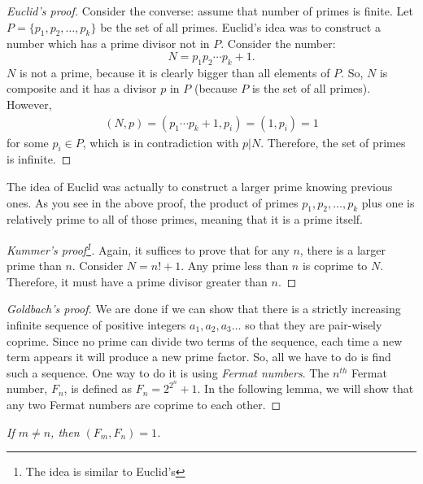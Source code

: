 \documentclass{subfiles}
\begin{document}
		\begin{proof}[Euclid's proof]
			Consider the converse: assume that number of primes is finite. Let $P=\{p_1,p_2,\ldots,p_k\}$ be the set of all primes. Euclid's idea was to construct a number which has a prime divisor not in $P$. Consider the number:
			\[N=p_1p_2\cdots p_k+1.\]
			$N$ is not a prime, because it is clearly bigger than all elements of $P$. So, $N$ is composite and it has a divisor $p$ in $P$ (because $P$ is the set of all primes). However,
				\begin{align}\label{eq:euclidprime}
					(N,p)=(p_1\cdots p_k+1,p_i)=(1,p_i)=1
				\end{align} 
			for some $p_i \in P$, which is in contradiction with $p|N$. Therefore, the set of primes is infinite.
		\end{proof}
		
		\begin{note}
			The idea of Euclid was actually to construct a larger prime knowing previous ones. As you see in the above proof, the product of primes $p_1, p_2, \ldots, p_k$ plus one is relatively prime to all of those primes, meaning that it is a prime itself.
		\end{note}
		
		\begin{proof}[Kummer's proof\footnote{The idea is similar to Euclid's}]
			Again, it suffices to prove that for any $n$, there is a larger prime than $n$. Consider $N=n!+1$. Any prime less than $n$ is coprime to $N$. Therefore, it must have a prime divisor greater than $n$.
		\end{proof}
		
		\begin{proof}[Goldbach's proof]
			We are done if we can show that there is a strictly increasing infinite sequence of positive integers $a_1,a_2,a_3\ldots$ so that they are pair-wisely coprime. Since no prime can divide two terms of the sequence, each time a new term appears it will produce a new prime factor. So, all we have to do is find such a sequence. One way to do it is using \textit{Fermat numbers}. The $n^{th}$ Fermat number, $F_n$, is defined as $F_n=2^{2^n}+1$. In the following lemma, we will show that any two Fermat numbers are coprime to each other.
		\end{proof}
		
		\begin{lemma}\slshape
			If $m\neq n$, then $(F_m,F_n)=1$.\label{lem:fermatcp}
		\end{lemma}
		
\end{document}
